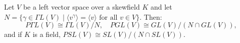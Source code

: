 Let $V$ be a left vector space over a skewfield $K$ and let $N = \{\gamma \in \Gamma L(V) \mid \langle v^\gamma \rangle = \langle v \rangle \text{ for all } v \in V\}$. Then:
$$P\Gamma L(V) \cong \Gamma L(V)/N, \quad PGL(V) \cong GL(V)/(N \cap GL(V)),$$
and if $K$ is a field, $PSL(V) \cong SL(V)/(N \cap SL(V))$.
